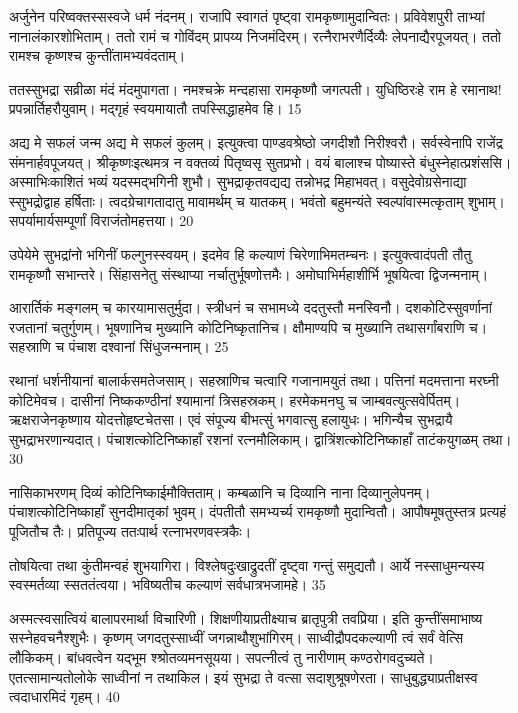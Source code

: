 अर्जुनेन परिष्वक्तस्सस्वजे धर्म नंदनम्।
राजापि स्वागतं पृष्ट्वा रामकृष्णामुदान्वितः।
प्रविवेशपुरी ताभ्यां नानालंकारशोभिताम्।
ततो रामं च गोविंदम् प्रापय्य निजमंदिरम्।
रत्नैराभरणैर्दिव्यैः लेपनाद्यैरपूजयत्।
ततो रामश्च कृष्णश्च कुन्तींतामभ्यवंदताम्।

ततस्सुभद्रा सव्रीळा मंदं मंदमुपागता।
नमश्चक्रे मन्दहासा रामकृष्णौ जगत्पती।
युधिष्ठिरःहे राम हे रमानाथ! प्रपन्नार्तिहरौयुवाम्।
मद्गृहं स्वयमायातौ तपस्सिद्धाहमेव हि।
15

अद्य मे सफलं जन्म अद्य मे सफलं कुलम्।
इत्युक्त्वा पाण्डवश्रेष्ठो जगदीशौ निरीश्वरौ।
सर्वस्वेनापि राजेंद्र संमनार्हवपूजयत्।
श्रीकृष्णःइत्थमत्र न वक्तव्यं पितृष्वसृ सुतप्रभो।
वयं बालाश्च पोष्यास्ते बंधुस्नेहात्प्रशंससि।
अस्माभिःकाशितं भव्यं यदस्मद्भगिनी शुभौ।
सुभद्राकृतवद्यद्य तन्नोभद्र मिहाभवत्।
वसुदेवोग्रसेनाद्या स्सुभद्रोद्वाह हर्षिताः।
त्वदग्रेचागतादातु मावामर्थम् च यातकम्।
भवंतो बहुमन्यंते स्वल्पांवास्मत्कृताम् शुभाम्।
सपर्यामार्यसम्पूर्णां विराजंतोमहत्तया।
20

उपेयेमे सुभद्रांनो भगिनीं फल्गुनस्स्वयम्।
इदमेव हि कल्याणं चिरेणाभिमतम्चनः।
इत्युक्त्वादंपती तौतु रामकृष्णौ सभान्तरे।
सिंहासनेतु संस्थाप्या नर्चातुर्भूषणोत्तमैः।
अमोघाभिर्महाशीर्भि भूषयित्वा द्विजन्मनाम्।

आरार्तिकं मङ्गलम् च कारयामासतुर्मुदा।
स्त्रीधनं च सभामध्ये ददतुस्तौ मनस्विनौ।
दशकोटिस्सुवर्णानां रजतानां चतुर्गुणम्।
भूषणानिच मुख्यानि कोटिनिष्कृतानिच।
क्षौमाण्यपि च मुख्यानि तथासर्गांबराणि च।
सहस्राणि च पंचाश दश्वानां सिंधुजन्मनाम्।
25

रथानां धर्शनीयानां बालार्कसमतेजसाम्।
सहस्राणिच चत्वारि गजानामयुतं तथा।
पत्तिनां मदमत्ताना मरघ्नी कोटिमेवच।
दासीनां निष्ककण्ठीनां श्यामानां त्रिसहस्रकम्।
हरमेकमनघु च जाम्बवत्युत्सवेर्पितम्।
ऋक्षराजेनकृष्णाय योदत्तोहृष्टचेतसा।
एवं संपूज्य बीभत्सुं भगवात्सु हलायुधः।
भगिन्यैच सुभद्रायै सुभद्राभरणान्यदात्।
पंचाशत्कोटिनिष्काहाँ रशनां रत्नमौलिकाम्।
द्वात्रिंशत्कोटिनिष्काहाँ ताटंकयुगळम् तथा।
30

नासिकाभरणम् दिव्यं कोटिनिष्काईमौक्तिताम्।
कम्बळानि च दिव्यानि नाना दिव्यानुलेपनम्।
पंचाशत्कोटिनिष्काहाँ सुनदीमातृकां भुवम्।
दंपतीतौ समभ्यर्च्य रामकृष्णौ मुदान्वितौ।
आपौषमूषतुस्तत्र प्रत्यहं पूजितौच तैः।
प्रतिपूज्य ततःपार्थ रत्नाभरणवस्त्रकैः।

तोषयित्वा तथा कुंतीमन्वहं शुभयागिरा।
विश्लेषदुःखाद्रुदतीं दृष्ट्वा गन्तुं समुद्यतौ।
आर्ये नस्साधुमन्यस्य स्वस्मर्तव्या स्सततंत्वया।
भविष्यतीच कल्याणं सर्वधात्रभजामहे।
35

अस्मत्स्वसात्वियं बालापरमार्था विचारिणी।
शिक्षणीयाप्रतीक्ष्याच ब्रातृपुत्री तवप्रिया।
इति कुन्तींसमाभाष्य सस्नेहवचनैश्शुभैः।
कृष्णम् जगदतुस्साध्वीं जगन्नाथौशुभांगिरम्।
साध्वीद्रौपदकल्याणी त्वं सर्वं वेत्सि लौकिकम्।
बांधवत्वेन यद्भूम श्श्रोतव्यमनसूयया।
सपत्नीत्वं तु नारीणाम् कण्ठरोगवदुच्यते।
एतत्सामान्यतोलोके साध्वीनां न तथाकिल।
इयं सुभद्रा ते वत्सा सदाशुश्रूषणेरता।
साधुबुद्ध्याप्रतीक्षस्व त्वदाधारमिदं गृहम्।
40

